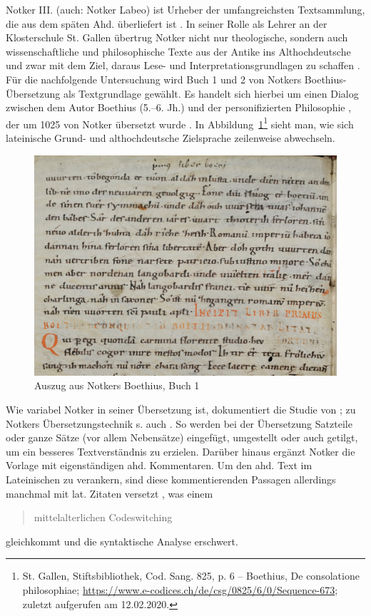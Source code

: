 Notker III. (auch: Notker Labeo) ist Urheber der umfangreichsten Textsammlung, die aus dem späten Ahd. überliefert ist \parencites[157]{Meineke2001}. In seiner Rolle als Lehrer an der Klosterschule St. Gallen übertrug Notker nicht nur theologische, sondern auch wissenschaftliche und philosophische Texte aus der Antike ins Althochdeutsche und zwar mit dem Ziel, daraus Lese- und Interpretationsgrundlagen zu schaffen \parencite[zur Übersicht s.][136]{Sonderegger2003}. Für die nachfolgende Untersuchung wird Buch 1 und 2 von Notkers Boethius-Übersetzung  als Textgrundlage gewählt. Es handelt sich hierbei um einen Dialog zwischen dem Autor Boethius (5.--6. Jh.) und der personifizierten Philosophie \parencite[vgl.][]{Gruber2006}, der um 1025 von Notker übersetzt wurde \parencite[138]{Sonderegger2003}. 
In Abbildung~\ref{abb:notker-hand}\footnote{St. Gallen, Stiftsbibliothek, Cod. Sang. 825, p. 6 – Boethius, De consolatione philosophiae; \url{https://www.e-codices.ch/de/csg/0825/6/0/Sequence-673}; zuletzt aufgerufen am 12.02.2020.} sieht man, wie sich lateinische Grund- und althochdeutsche Zielsprache zeilenweise abwechseln.   

 \begin{figure}[h]
\begin{center}
  \includegraphics[width=10 cm]{images/notker-handschrift-buch1-ausschnitt.jpg}
\caption {Auszug aus Notkers Boethius, Buch 1}
\label{abb:notker-hand}
\end{center}
\end{figure} 


Wie variabel Notker in seiner Übersetzung ist, dokumentiert die Studie von \textcite{Eilers2003}; zu Notkers Übersetzungstechnik s. auch \textcite{Glauch2003}. So werden bei der Übersetzung Satzteile oder ganze Sätze (vor allem Nebensätze) eingefügt, umgestellt oder auch getilgt, um ein besseres Textverständnis zu erzielen. Darüber hinaus ergänzt Notker die Vorlage mit eigenständigen ahd. Kommentaren. Um den ahd. Text im Lateinischen zu verankern, sind diese kommentierenden Passagen allerdings manchmal mit lat. Zitaten versetzt \parencite[vgl.][137]{Sonderegger2003}, was einem \blockcquote{Glaser2016}{mittelalterlichen Codeswitching} gleichkommt und die syntaktische Analyse erschwert.  


